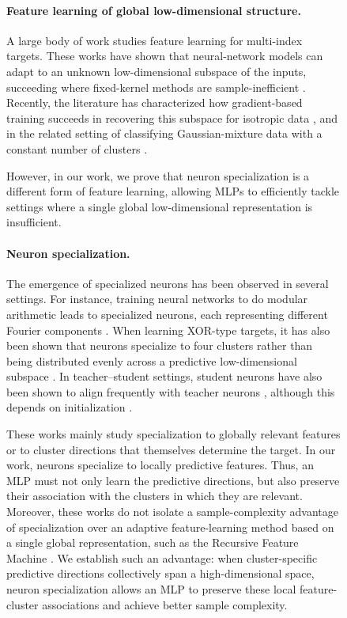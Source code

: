 \documentclass{article}
\newcounter{setting}[section]
\newcounter{model}[section]
\newcounter{initialization}[section]
\begin{document}
\begin{figure}
\paragraph{Feature learning of global low-dimensional structure.}
A large body of work studies feature learning for multi-index
targets. These works have shown that neural-network models can adapt to an unknown
low-dimensional subspace of the inputs, succeeding where fixed-kernel methods are sample-inefficient
\citep{bach2017breaking,soltanolkotabi2017learning,
yehudai2019power,ghorbani2020when}. Recently, the literature has characterized how gradient-based training succeeds in recovering this subspace for isotropic data
\citep{abbe2022merged,abbe2023sgd,damian2022neural,ba2022highdimensional,dandi2024giant,damian2025generative,bruna2025survey}, and in the related setting of classifying Gaussian-mixture data with a constant number of clusters
\citep{pmlr-v139-refinetti21b,arous2024highdimensional}.


However, in our work, we prove that neuron specialization is a different form of feature learning, allowing MLPs to efficiently tackle settings where a single global low-dimensional representation is insufficient.

\paragraph{Neuron specialization.} The emergence of
specialized neurons has been observed in several settings. For instance, training neural networks to do modular arithmetic leads to specialized neurons, each representing different Fourier components
\citep{nanda2023progress,gromov2023grokking,morwani2024feature,
he2026mechanism,he2026neural}. When learning XOR-type targets, it has also been shown that neurons specialize to four clusters rather than being distributed evenly across a predictive low-dimensional subspace \citep{frei2023random,glasgow2024sgd}. In teacher--student settings, student neurons have also been shown to align frequently with teacher neurons \citep{tian2020student,oostwal2021hidden,zhu2025gradient}, although this depends on initialization \citep{jarvis2025theory}.

These works mainly study specialization to globally relevant features or to cluster directions that themselves determine the target. In our work, neurons specialize to locally predictive features. Thus, an MLP must not only learn the predictive directions, but also preserve their association with the clusters in which they are relevant. Moreover, these works do not isolate a sample-complexity advantage of specialization over an adaptive feature-learning method based on a single global representation, such as the Recursive Feature Machine \citep{radhakrishnan2024mechanism}. We establish such an advantage: when cluster-specific predictive directions collectively span a high-dimensional space, neuron specialization allows an MLP to preserve these local feature-cluster associations and achieve better sample complexity.


\end{figure}
\end{document}
